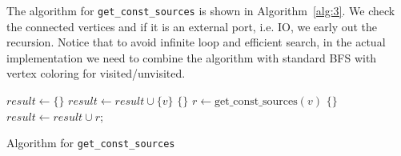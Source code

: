 \documentclass{article}
\begin{document}
The algorithm for \texttt{get\_const\_sources} is shown in Algorithm~\ref{alg:3}. We check the
connected vertices and if it is an external port, i.e. IO, we early out the recursion. Notice
that to avoid infinite loop and efficient search, in the actual implementation we need to
combine the algorithm with standard BFS with vertex coloring for visited/unvisited.
\begin{algorithm}[!tbh]
    \label{alg:3}
    $result \gets \{\}$\;
     {
         {
            $result \gets result \cup \{v\}$\;
        } {
             {
                \Return $\{\}$\;
            }
            $r \gets \text{get\_const\_sources}(v)$\;
             {
                \Return $\{\}$\;
            }
            $result \gets result \cup r$;
        }
    }
    \;
 \caption{Algorithm for \texttt{get\_const\_sources}}
\end{algorithm}
\end{document}
